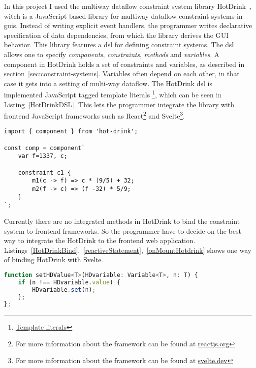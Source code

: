 In this project I used the multiway dataflow constraint system library 
HotDrink~\cite{HotDrink}, witch is a JavaScript-based library for multiway dataflow 
constraint systems in \gls{gui}s. Instead of writing explicit event handlers,
the programmer writes declarative specification of data dependencies,
from which the library derives the GUI behavior.
This library features a \gls{dsl} for defining constraint systems.
The \gls{dsl} allows one to specify \emph{components}, \emph{constraints}, \emph{methods} 
and \emph{variables}.
A component in HotDrink holds a set of constraints and variables, as described in 
section~\ref{sec:constraint-systems}. Variables often depend on each other,
in that case it gets into a setting of multi-way dataflow.
The HotDrink \gls{dsl} is implemented JavaScript tagged template literals
\footnote{\href{https://developer.mozilla.org/en-US/docs/Web/JavaScript/Reference/Template_literals}{Template literals}}, 
which can be seen in Listing~\ref{HotDrinkDSL}. This lets the programmer integrate the 
library with frontend JavaScript frameworks such as 
React\footnote{For more information about the framework can be found at \href{https://reactjs.org/}{reactjs.org}} and 
Svelte\footnote{For more information about the framework can be found at \href{https://svelte.dev/}{svelte.dev}}. 

\begin{lstlisting}[caption={Example of the HotDrink \gls{dsl}},label=HotDrinkBind, language=hotdrink]
import { component } from 'hot-drink';

const comp = component`
    var f=1337, c;

    constraint c1 {
        m1(c -> f) => c * (9/5) + 32;
        m2(f -> c) => (f -32) * 5/9;
    }
`;
\end{lstlisting}

Currently there are no integrated methods in HotDrink to bind the constraint system to 
frontend frameworks. So the programmer have to decide on the best way to integrate the 
HotDrink to the frontend web application. 
Listings~\ref{HotDrinkBind},~\ref{reactiveStatement},~\ref{onMountHotdrink} shows one 
way of binding HotDrink with Svelte.

\begin{lstlisting}[caption={Function for binding HotDrink and Svelte variable},label=HotDrinkBinding, language=javascript]
function setHDValue<T>(HDvariable: Variable<T>, n: T) {
    if (n !== HDvariable.value) { 
        HDvariable.set(n);
    };
};
\end{lstlisting}


